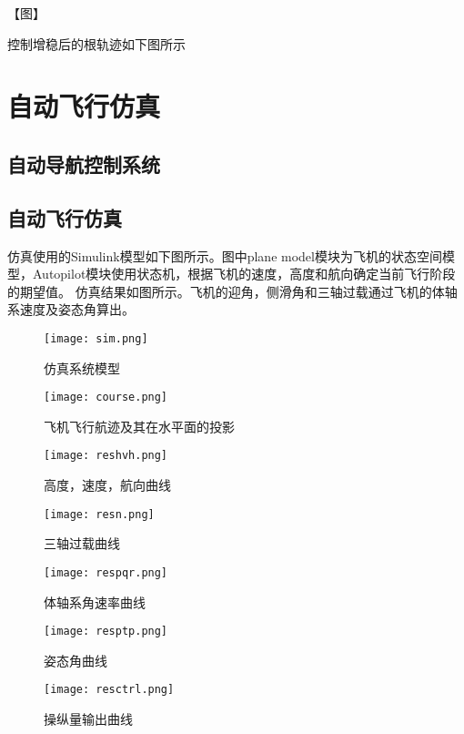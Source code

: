 【图】

控制增稳后的根轨迹如下图所示

\clearpage
\section{自动飞行仿真}
\subsection{自动导航控制系统}
\clearpage
\subsection{自动飞行仿真}
仿真使用的Simulink模型如下图所示。图中plane model模块为飞机的状态空间模型，Autopilot模块使用状态机，根据飞机的速度，高度和航向确定当前飞行阶段的期望值。
仿真结果如图所示。飞机的迎角，侧滑角和三轴过载通过飞机的体轴系速度及姿态角算出。

\begin{figure}[!h]
\centering\texttt{[image: sim.png]}
\caption{仿真系统模型}
\label{sim}
\end{figure}

\begin{figure}[!h]
\centering\texttt{[image: course.png]}
\caption{飞机飞行航迹及其在水平面的投影}
\label{course}
\end{figure}

\begin{figure}[!h]
\centering\texttt{[image: reshvh.png]}
\caption{高度，速度，航向曲线}
\label{course}
\end{figure}

\begin{figure}[!h]
\centering\texttt{[image: resn.png]}
\caption{三轴过载曲线}
\label{course}
\end{figure}

\begin{figure}[!h]
\centering\texttt{[image: respqr.png]}
\caption{体轴系角速率曲线}
\label{course}
\end{figure}

\begin{figure}[!h]
\centering\texttt{[image: resptp.png]}
\caption{姿态角曲线}
\label{course}
\end{figure}

\begin{figure}[!h]
\centering\texttt{[image: resctrl.png]}
\caption{操纵量输出曲线}
\label{course}
\end{figure}

\endinput
